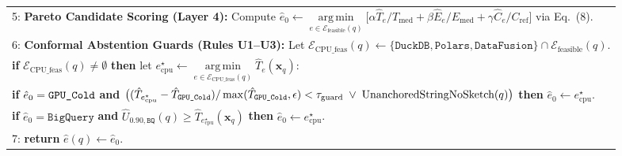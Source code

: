 \documentclass[10pt,a4paper]{article}
\newenvironment{fitasttable}{%
  \begin{lrbox}{\asttblbox}%
}{%
  \end{lrbox}%
  \sbox{\asttblboxB}{%
    \ifdim\wd\asttblbox>0.96\textwidth
      \resizebox{0.96\textwidth}{!}{\usebox{\asttblbox}}%
    \else
      \usebox{\asttblbox}%
    \fi
  }%
  \ifdim\ht\asttblboxB>0.72\textheight
    \resizebox{!}{0.72\textheight}{\usebox{\asttblboxB}}%
  \else
    \usebox{\asttblboxB}%
  \fi
}
\begin{document}
\begin{table}[!t]
\begin{fitasttable}
\begin{tabular}{@{}p{}@{}}
5: \textbf{Pareto Candidate Scoring (Layer 4):} Compute $\hat{e}_0 \leftarrow \operatorname*{arg\,min}\limits_{e \in \mathcal{E}_{\text{feasible}}(q)} \big[\alpha \hat{T}_e/T_{\text{med}} + \beta \hat{E}_e/E_{\text{med}} + \gamma \hat{C}_e/C_{\text{ref}}\big]$ via Eq.~(8). \\
6: \textbf{Conformal Abstention Guards (Rules U1--U3):} Let $\mathcal{E}_{\text{CPU\_feas}}(q) \leftarrow \{\texttt{DuckDB},\texttt{Polars},\texttt{DataFusion}\}\cap\mathcal{E}_{\text{feasible}}(q)$. \\
\hspace*{1.2em}\textbf{if} $\mathcal{E}_{\text{CPU\_feas}}(q) \neq \emptyset$ \textbf{then} let $e_{\text{cpu}}^\star \leftarrow \operatorname*{arg\,min}\limits_{e \in \mathcal{E}_{\text{CPU\_feas}}(q)} \hat{T}_e(\mathbf{x}_q)$: \\
\hspace*{2.4em}\textbf{if} $\hat{e}_0 = \texttt{GPU\_\allowbreak{}Cold}$ \textbf{and} $\big((\hat{T}_{e_{\text{cpu}}^\star} - \hat{T}_{\texttt{GPU\_\allowbreak{}Cold}})/\max(\hat{T}_{\texttt{GPU\_\allowbreak{}Cold}},\epsilon) < \tau_{\text{guard}} \;\vee\; \text{UnanchoredStringNoSketch}(q)\big)$ \textbf{then} $\hat{e}_0 \leftarrow e_{\text{cpu}}^\star$. \\
\hspace*{2.4em}\textbf{if} $\hat{e}_0 = \texttt{BigQuery}$ \textbf{and} $\hat{U}_{0.90,\texttt{BQ}}(q) \ge \hat{T}_{e_{\text{cpu}}^\star}(\mathbf{x}_q)$ \textbf{then} $\hat{e}_0 \leftarrow e_{\text{cpu}}^\star$. \\
7: \textbf{return} $\hat{e}(q) \leftarrow \hat{e}_0$. \\
\bottomrule
\end{tabular}
\end{fitasttable}
\end{table}
\end{document}
